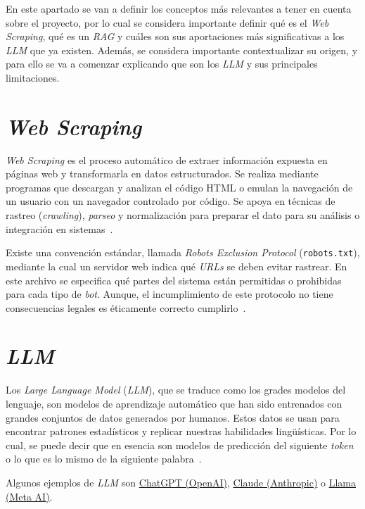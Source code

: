 
En este apartado se van a definir los conceptos más relevantes a tener en cuenta sobre el proyecto, por lo cual se considera importante definir qué es el \textit{Web Scraping}, qué es un \textit{RAG} y cuáles son sus aportaciones más significativas a los \textit{LLM} que ya existen. Además, se considera importante contextualizar su origen, y para ello se va a comenzar explicando que son los \textit{LLM} y sus principales limitaciones.

\section{\textit{Web Scraping}}
\textit{Web Scraping} es el proceso automático de extraer información expuesta en páginas web y transformarla en datos estructurados. Se realiza mediante programas que descargan y analizan el código HTML o emulan la navegación de un usuario con un navegador controlado por código. Se apoya en técnicas de rastreo (\textit{crawling}), \textit{parseo} y normalización para preparar el dato para su análisis o integración en sistemas~\cite{webScraping}.

Existe una convención estándar, llamada \textit{Robots Exclusion Protocol} (\texttt{robots.txt}), mediante la cual un servidor web indica qué \textit{URLs} se deben evitar rastrear. En este archivo se especifica qué partes del sistema están permitidas o prohibidas para cada tipo de \textit{bot}. Aunque, el incumplimiento de este protocolo no tiene consecuencias legales es éticamente correcto cumplirlo~\cite{rfc9309}. 

\section{\textit{LLM}}
Los \textit{Large Language Model} (\textit{LLM}), que se traduce como los grades modelos del lenguaje, son modelos de aprendizaje automático que han sido entrenados con grandes conjuntos de datos generados por humanos. Estos datos se usan para encontrar patrones estadísticos y replicar nuestras habilidades lingüísticas. Por lo cual, se puede decir que en esencia son modelos de predicción del siguiente \textit{token} o lo que es lo mismo de la siguiente palabra~\cite{book:RAG_SimpleGuide}.

Algunos ejemplos de \textit{LLM} son \href{https://chat.openai.com}{ChatGPT (OpenAI)}, \href{https://claude.ai}{Claude (Anthropic)} o \href{https://ai.meta.com/llama/}{Llama (Meta AI)}.

